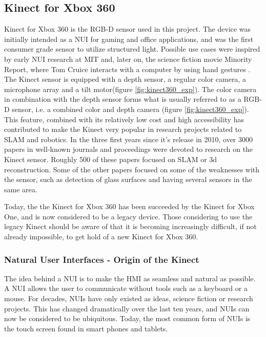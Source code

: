 \subsection{Kinect for Xbox 360}

Kinect for Xbox 360 is the RGB-D sensor used in this project. The device  was initially intended as a \ac{NUI} for gaming and office applications, and was the first consumer grade sensor to utilize structured light. Possible use cases were inspired by early \ac{NUI} research at \ac{MIT} and, later on, the science fiction movie Minority Report, where Tom Cruice interacts with a computer by using hand gestures \cite{kinect_book}. The Kinect sensor is equipped with a depth sensor, a regular color camera, a microphone array and a tilt motor(figure \ref{fig:kinect360_exp}). The color camera in combination with the depth sensor forms what is usually referred to as a RGB-D sensor, i.e. a combined color and depth camera (figure \ref{fig:kinect360_exp}). This feature, combined with its relatively low cost and high accessibility has contributed to make the Kinect very popular in research projects related to \ac{SLAM} and robotics. In the three first years since it's release in 2010, over 3000 papers in well-known journals and proceedings were devoted to research on the Kinect sensor. Roughly 500 of these papers focused on \ac{SLAM} or 3d reconstruction\cite{Berger2013}. Some of the other papers focused on some of the weaknesses with the sensor, such as detection of glass surfaces and having several sensors in the same area. 


Today, the the Kinect for Xbox 360 has been succeeded by the Kinect for Xbox One, and is now considered to be a legacy device. Those considering to use the legacy Kinect should be aware of that it is becoming increasingly difficult, if not already impossible, to get hold of a new Kinect for Xbox 360. 

\subsubsection{Natural User Interfaces - Origin of the Kinect}

The idea behind a \ac{NUI} is to make the \ac{HMI} as seamless and natural as possible. A \ac{NUI} allows the user to communicate without tools such as a keyboard or a mouse. For decades, \ac{NUI}s have only existed as ideas, science fiction or research projects. This has changed dramatically over the last ten years, and \ac{NUI}s can now be considered to be ubiquitous. Today, the most common form of \ac{NUI}s is the touch screen found in smart phones and tablets. 

